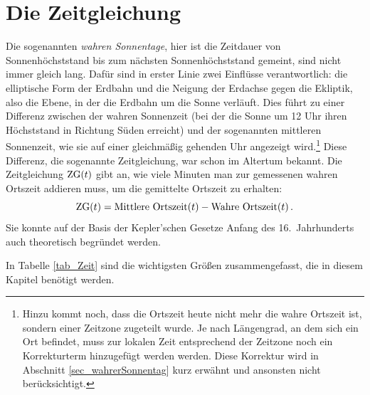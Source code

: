 
\chapter{Die Zeitgleichung}
\label{chap_Zeitgleichung}

Die sogenannten \textit{wahren Sonnentage}, 
hier ist die Zeitdauer von Sonnenh\"ochststand bis zum n\"achsten Sonnenh\"ochststand
gemeint, sind nicht immer gleich lang. Daf\"ur sind in erster Linie zwei Einfl\"usse verantwortlich:
die elliptische Form der Erdbahn und die Neigung der Erdachse gegen die 
Ekliptik, also die Ebene, in der die Erdbahn um die Sonne verl\"auft. Dies f\"uhrt zu einer 
Differenz zwischen der wahren Sonnenzeit 
(bei der die Sonne um 12 Uhr ihren H\"ochststand
in Richtung S\"uden erreicht) und der sogenannten mittleren Sonnenzeit, wie sie auf einer 
gleichm\"a\ss ig gehenden Uhr angezeigt wird.\footnote{Hinzu kommt noch, dass die Ortszeit heute
nicht mehr die wahre Ortszeit ist, sondern einer Zeitzone zugeteilt wurde. Je nach L\"angengrad, an
dem sich ein Ort befindet, muss zur lokalen Zeit entsprechend der Zeitzone noch ein Korrekturterm
hinzugef\"ugt werden werden. Diese Korrektur wird in Abschnitt \ref{sec_wahrerSonnentag} kurz 
erw\"ahnt und ansonsten nicht ber\"ucksichtigt.}
Diese Differenz, die sogenannte Zeitgleichung, 
war schon im Altertum bekannt. Die Zeitgleichung ${\rm ZG}(t)$ gibt an, wie viele Minuten man zur gemessenen 
wahren Ortszeit addieren muss, um die gemittelte Ortszeit zu erhalten:
\begin{equation}
       {\rm ZG}(t) = \mbox{Mittlere Ortszeit}(t) - \mbox{Wahre Ortszeit}(t) \, .
\end{equation}
Sie konnte auf der Basis der Kepler'schen Gesetze Anfang des 16.\ Jahrhunderts auch theoretisch
begr\"undet werden. 

In Tabelle \ref{tab_Zeit} sind die wichtigsten Gr\"o\ss en zusammengefasst, die in diesem
Kapitel ben\"otigt werden.%

